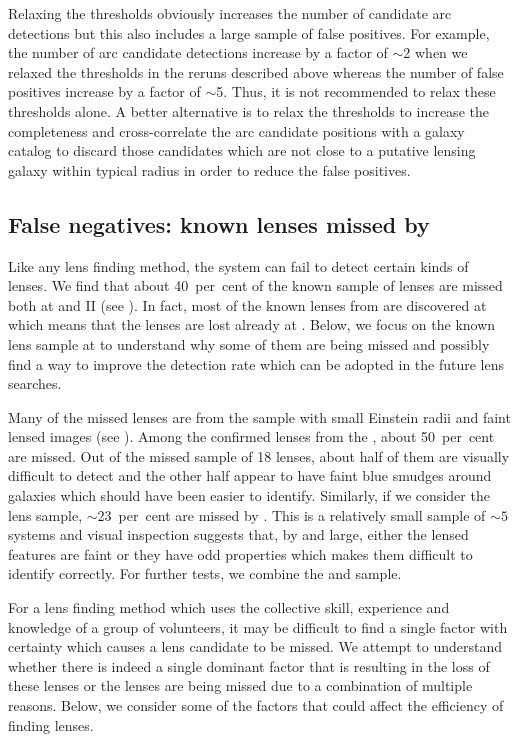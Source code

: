 \documentclass[useAMS,usenatbib,a4paper]{mn2e}
\begin{document}
Relaxing the thresholds obviously increases the number of candidate arc
detections but this also includes a large sample of false positives.
For example, the number of arc candidate detections increase by a factor
of $\sim$2 when we relaxed the thresholds in the reruns described above
whereas the number of false positives increase by a factor of $\sim$5.
Thus, it is not recommended to relax these thresholds alone. A better
alternative is to relax the thresholds to increase the completeness and
cross-correlate the arc candidate positions with a galaxy catalog to
discard those candidates which are not close to a putative lensing
galaxy within typical radius in order to reduce the false positives.


\subsection{False negatives: known lenses missed by \sw}
\label{sec:fn}
Like any lens finding method, the \sw system can fail to detect certain
kinds of lenses.  We find that about 40~per~cent of the known sample of lenses
are missed both at \StageOne and II (see ). In fact, most
of the known lenses from \StageOne are discovered at \StageTwo which
means that the lenses are lost already at \StageOne. Below, we focus on the known
lens sample at \StageOne to understand why some of them are being missed
and possibly find a way to improve the detection rate which can be
adopted in the future \sw lens searches.

Many of the missed lenses are from the \rf sample with small
Einstein radii and faint lensed images (see ). Among
the confirmed lenses from the \rf, about 50~per~cent are missed. Out of the
missed sample of 18 lenses, about half of them are visually difficult to
detect and the other half appear to have faint blue smudges around
galaxies which should have been easier to identify. Similarly,
if we consider the \af lens sample, $\sim$23~per~cent are missed by \sw. This
is a relatively small sample of $\sim 5$ systems and visual inspection
suggests that, by and large, either the lensed features are faint
or they have odd properties which makes them difficult to identify
correctly. For further tests, we combine the \rf and \af sample.

For a lens finding method which uses the collective skill, experience and
knowledge of a group of volunteers, it may be difficult to find a single
factor with certainty which causes a lens candidate to be missed. We
attempt to understand whether there is indeed a single dominant factor
that is resulting in the loss of these lenses or the lenses are being
missed due to a combination of multiple reasons. Below, we consider some
of the factors that could affect the efficiency of finding lenses.
\end{document}
